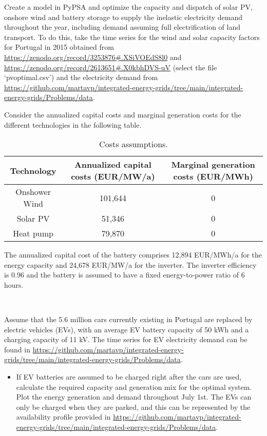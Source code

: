 \documentclass[10pt]{article}
\newenvironment{problem}[2][Problem]{\begin{trivlist}
\item[\hskip \labelsep {\bfseries #1}\hskip \labelsep {\bfseries #2.}]}{\end{trivlist}}
\begin{document}
\begin{problem}{11.2}

Create a model in PyPSA and optimize the capacity and dispatch of solar PV, onshore wind and battery storage to supply the inelastic electricity demand throughout the year, including demand assuming full electrification of land transport.  To do this, take the time series for the wind and solar capacity factors for Portugal in 2015 obtained from \url{https://zenodo.org/record/3253876#.XSiVOEdS8l0}
and \url{https://zenodo.org/record/2613651#.X0kbhDVS-uV} (select the file ‘pvoptimal.csv’) and the electricity demand from \url{https://github.com/martavp/integrated-energy-grids/tree/main/integrated-energy-grids/Problems/data}.

Consider the annualized capital costs and marginal generation costs for the different technologies in the following table. 

\begin{table}[h]
    \centering
    \begin{tabular}{ccc}
    \hline
        Technology & Annualized capital costs (EUR/MW/a) & Marginal generation costs (EUR/MWh) \\
    \hline
    Onshower Wind &  101,644 & 0 \\
         Solar PV &  51,346 & 0 \\
         Heat pump & 79,870 &  0  \\
    \hline
    \end{tabular}
    \caption{Costs assumptions.}
    \label{tab:my_label}
\end{table}

The annualized capital cost of the battery comprises  12,894 EUR/MWh/a for the energy capacity and 24,678 EUR/MW/a for the inverter. The inverter efficiency is 0.96 and the battery is assumed to have a fixed energy-to-power ratio of 6 hours.

\

 Assume that the 5.6 million cars currently existing in Portugal are replaced by electric vehicles (EVs), with an average EV battery capacity of 50 kWh and a charging capacity of 11 kV.  The time series for EV electricity demand can be found in \url{https://github.com/martavp/integrated-energy-grids/tree/main/integrated-energy-grids/Problems/data}.

 

\begin{itemize}
\item[a)] If EV batteries are assumed to be charged right after the cars are used, calculate the required capacity and generation mix for the optimal system. Plot the energy generation and demand throughout July 1st. The EVs can only be charged when they are parked, and this can be represented by the availability profile provided in \url{https://github.com/martavp/integrated-energy-grids/tree/main/integrated-energy-grids/Problems/data}.


\end{itemize}
\end{problem}
\end{document}
